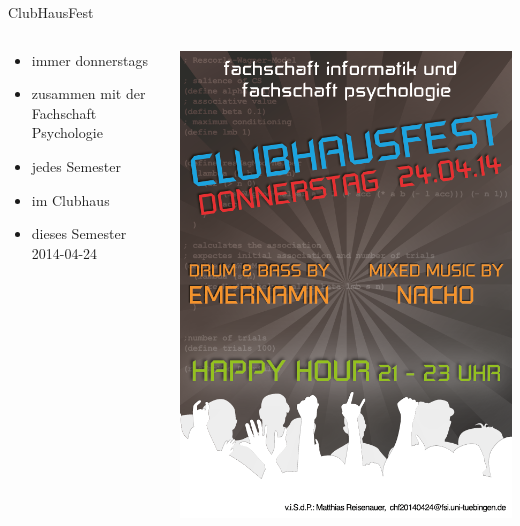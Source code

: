 \documentclass{beamer}
\begin{document}
	\begin{frame}{ClubHausFest}
		\begin{columns}
			\begin{column}{.5\linewidth}
				\begin{itemize}
					\item immer donnerstags
					\item zusammen mit der Fachschaft Psychologie
					\item jedes Semester
					\item im Clubhaus
					\item dieses Semester 2014-04-24
				\end{itemize}
			\end{column}
			\begin{column}{.5\linewidth}
				\includegraphics[width=\linewidth]{CHF_Flyer.png}
			\end{column}
		\end{columns}
	\end{frame}
\end{document}
